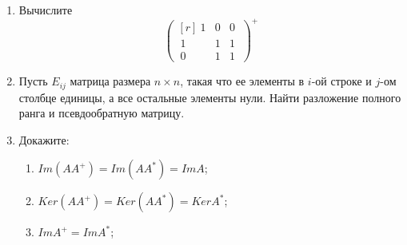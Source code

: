 \begin{enumerate}
    \item Вычислите  \[\begin{pmatrix}[r] ~1&0&0~\\~1 & 1 & 1~\\~0 & 1 & 1~\end{pmatrix}^+\]
    \item Пусть $E_{ij}$ матрица размера $n\times n$, такая что ее элементы в $i$-ой строке и $j$-ом столбце единицы, а все остальные элементы нули. Найти разложение полного ранга и псевдообратную матрицу.
    \item Докажите:\begin{enumerate}
        \item $Im(AA^+) = Im(AA^*) = Im A$;
        \item $Ker (AA^+) = Ker (AA^*) = Ker A^*$;
        \item $Im A^+ = Im A^*$;
    \end{enumerate}
\end{enumerate}
